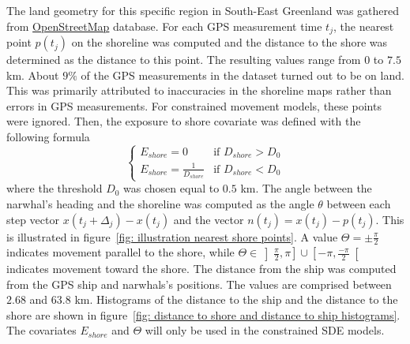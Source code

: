 \documentclass[11pt]{article}
\newcommand {\1}{\mathbb{1}}
\begin{document}
The land geometry for this specific region in South-East Greenland was gathered from \href{https://www.openstreetmap.org/#map=11/70.4029/-27.2928}{OpenStreetMap} database.
For each GPS measurement time $t_j$, the nearest point $p(t_j)$ on the shoreline was computed and the distance to the shore was determined as the distance to this point. The resulting values range from $0$ to $7.5$ km. About $9\%$ of the GPS measurements in the dataset turned out to be on land. This was primarily attributed to inaccuracies in the shoreline maps rather than errors in GPS measurements. For constrained movement models, these points were ignored. Then, the exposure to shore covariate was defined with the following formula
\begin{equation}
\left\{
\begin{array}{ll}
	 E_{shore}=0 & \mbox{if } D_{shore}>D_0 \\
	E_{shore}=\frac{1}{D_{shore}} & \mbox{if } D_{shore} < D_0
\end{array}
\right.
\label{eq: exp shore definition}
\end{equation}
where the threshold $D_0$ was chosen equal to $0.5$ km.
The angle between the narwhal's heading and the shoreline was computed as the angle $\theta$ between each step vector $x(t_j+\Delta_j)-x(t_j)$ and the vector $n(t_j)=x(t_j)-p(t_j)$. This is illustrated in figure~\ref{fig: illustration nearest shore points}. A value $\Theta=\pm \frac{\pi}{2}$ indicates movement parallel to the shore, while $\Theta \in \left]\frac{\pi}{2},\pi\right] \cup \left[-\pi,\frac{-\pi}{2}\right[$ indicates movement toward the shore. 
The distance from the ship was computed from the GPS ship and narwhals's positions. The values are comprised between $2.68$ and $63.8$ km.
Histograms of the distance to the ship and the distance to the shore are shown in figure~\ref{fig: distance to shore and distance to ship histograms}. The covariates $E_{shore}$ and $\Theta$ will only be used in the constrained SDE models.
\end{document}
